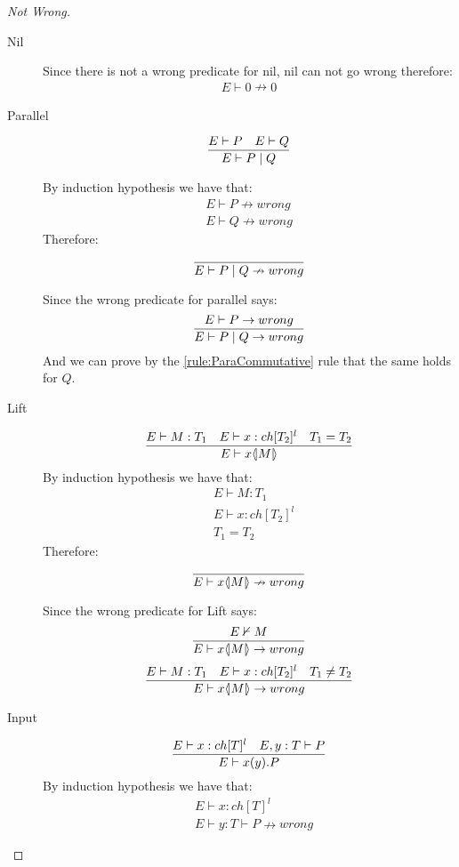 \vspace{10mm}
\begin{proof}[Not Wrong]
	\begin{description}
	\item[Nil]
		Since there is not a wrong predicate for nil, nil can not go wrong therefore:
		\begin{align*}
		E \vdash 0 \nrightarrow 0
		\end{align*}
	\item[Parallel]
		\begin{align*}
		\frac{E \vdash P \quad E \vdash Q }{E \vdash P \mid Q}
		\end{align*}
		
		By induction hypothesis we have that: 
		\begin{align*}
		E \vdash P \nrightarrow wrong\\
		E \vdash Q \nrightarrow wrong
		\end{align*}
		Therefore:
		\begin{align*}
		\frac{}{E \vdash P \mid Q \nrightarrow wrong}
		\end{align*}
		
		Since the wrong predicate for parallel says:
		\begin{align*}
		\frac{E \vdash P \rightarrow wrong}{E \vdash P \mid Q \rightarrow wrong}
		\end{align*}
		And we can prove by the \ref{rule:ParaCommutative} rule that the same holds for $Q$.
	\item[Lift]
		\begin{align*}
		\frac{E \vdash M:T_1 \quad E \vdash x:ch[T_2]^l \quad T_1 = T_2}{E \vdash x \langle \! | M | \! \rangle}
		\end{align*}
		By induction hypothesis we have that:
		\begin{align*}
		&E \vdash M:T_1\\
		&E \vdash x:ch[T_2]^l\\
		&T_1 = T_2
		\end{align*}
		Therefore:
		\begin{align*}
		\frac{}{E \vdash x \langle \! | M | \! \rangle \nrightarrow wrong}
		\end{align*}
		
		Since the wrong predicate for Lift says:
		\begin{align*}
		\frac{E \nvdash M}{E \vdash x \langle \! | M | \! \rangle \rightarrow wrong}
		\end{align*}
		\begin{align*}
		\frac{E \vdash M:T_1 \quad E \vdash x:ch[T_2]^l \quad T_1 \neq T_2}{E \vdash x \langle \! | M | \! \rangle \rightarrow wrong}
		\end{align*}
	\item[Input]
		\begin{align*}
		\frac{E \vdash x:ch[T]^l \quad E,y:T \vdash P}{E \vdash x(y).P}
		\end{align*}
		By induction hypothesis we have that:
		\begin{align*}
		&E \vdash x:ch[T]^l\\
		&E \vdash y:T \vdash P \nrightarrow wrong
		\end{align*}
		

\end{description}
\end{proof}
